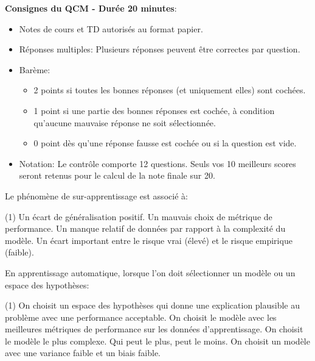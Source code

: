 \documentclass[solutions]{../cc}
\begin{document}
	
	\student
		
	\noindent \textbf{Consignes du QCM - Durée 20 minutes}:
	\begin{itemize}[nosep]
		\item Notes de cours et TD autorisés au format papier.
		\item Réponses multiples: Plusieurs réponses peuvent être correctes par question.
		\item Barème:
		\begin{itemize}[nosep]
			\item 2 points si toutes les bonnes réponses (et uniquement elles) sont cochées.
			\item 1 point si une partie des bonnes réponses est cochée, à condition qu'aucune mauvaise réponse ne soit sélectionnée.
			\item 0 point dès qu'une réponse fausse est cochée ou si la question est vide.
		\end{itemize}
		\item Notation: Le contrôle comporte 12 questions. Seuls vos 10 meilleurs scores seront retenus pour le calcul de la note finale sur 20.
	\end{itemize}

	\begin{question}
		Le phénomène de sur-apprentissage est associé à:
		\begin{tasks}(1)
			\task Un écart de généralisation positif.
			\task Un mauvais choix de métrique de performance.
			\task Un manque relatif de données par rapport à la complexité du modèle.
			\task Un écart important entre le risque vrai (élevé) et le risque empirique (faible).
		\end{tasks}
	\end{question}
	
	\begin{question}
		En apprentissage automatique, lorsque l'on doit sélectionner un modèle ou un espace des hypothèses:
		\begin{tasks}(1)
			\task On choisit un espace des hypothèses qui donne une explication plausible au problème avec une performance acceptable.
			\task On choisit le modèle avec les meilleures métriques de performance sur les données d'apprentissage.
			\task On choisit le modèle le plus complexe. Qui peut le plus, peut le moins.
			\task On choisit un modèle avec une variance faible et un biais faible.
		\end{tasks}
	\end{question}
\end{document}
